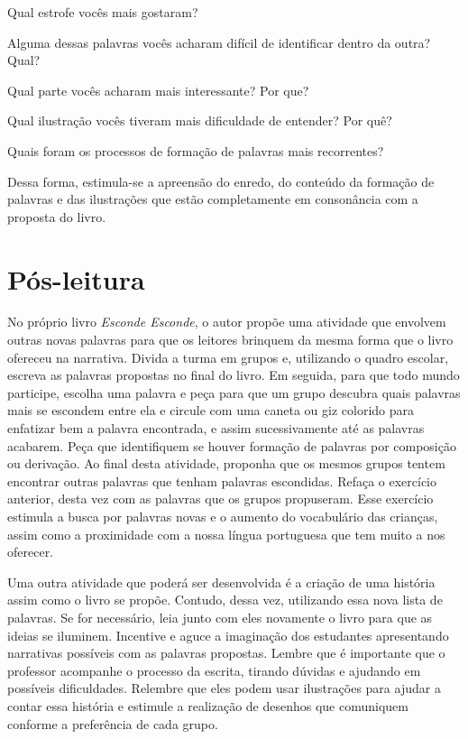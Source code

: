 \documentclass[11pt]{extarticle}
\begin{document}
\item Qual estrofe vocês mais gostaram?
\item Alguma dessas palavras vocês acharam difícil de identificar dentro da outra? Qual?
\item Qual parte vocês acharam mais interessante? Por que?
\item Qual ilustração vocês tiveram mais dificuldade de entender? Por quê?
\item Quais foram os processos de formação de palavras mais recorrentes?

Dessa forma, estimula-se a apreensão do enredo, do conteúdo da formação de palavras e das ilustrações que estão completamente em consonância com a proposta do livro.

\section{Pós-leitura}


No próprio livro \textit{Esconde Esconde}, o autor propõe uma atividade que envolvem outras novas palavras para que os leitores brinquem da mesma forma que o livro ofereceu na narrativa. Divida a turma em grupos e, utilizando o quadro escolar, escreva as palavras propostas no final do livro. Em seguida, para que todo mundo participe, escolha uma palavra e peça para que um grupo descubra quais palavras mais se escondem entre ela e circule com uma caneta ou giz colorido para enfatizar bem a palavra encontrada, e assim sucessivamente até as palavras acabarem. Peça que identifiquem se houver formação de palavras por composição ou derivação. Ao final desta atividade, proponha que os mesmos grupos tentem encontrar outras palavras que tenham palavras escondidas. Refaça o exercício anterior, desta vez com as palavras que os grupos propuseram. Esse exercício estimula a busca por palavras novas e o aumento do vocabulário das crianças, assim como a proximidade com a nossa língua portuguesa que tem muito a nos oferecer.

Uma outra atividade que poderá ser desenvolvida é a criação de uma história assim como o livro se propõe. Contudo, dessa vez, utilizando essa nova lista de palavras. Se for necessário, leia junto com eles novamente o livro para que as ideias se iluminem. Incentive e aguce a imaginação dos estudantes apresentando narrativas possíveis com as palavras propostas. Lembre que é importante que o professor acompanhe o processo da escrita, tirando dúvidas e ajudando em possíveis dificuldades. Relembre que eles podem usar ilustrações para ajudar a contar essa história e estimule a realização de desenhos que comuniquem conforme a preferência de cada grupo.
\end{document}
